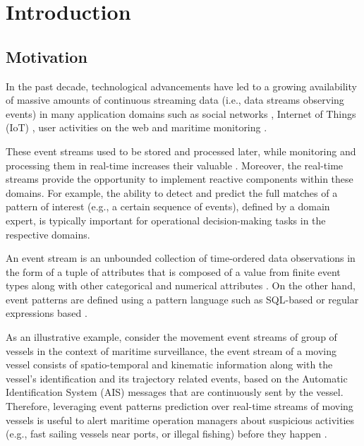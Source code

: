 \chapter{Introduction}


\section{Motivation}
\par In the past decade, technological advancements have led to a growing availability of massive amounts of continuous streaming data (i.e., data streams observing events) in many application domains such as social networks \cite{reuter2012event,mathioudakis2010twittermonitor}, Internet of Things (IoT) \cite{miorandi2012internet}, user activities on the web \cite{banerjee2001clickstream,metwally2005duplicate} and maritime monitoring \cite{patroumpas2015event,laxhammar2010conformal}.



\par These event streams used to be stored and processed later, while monitoring and processing them in real-time increases their valuable \cite{carney2002monitoring}. Moreover, the real-time streams provide the opportunity to implement reactive components within these domains.  For example, the ability to detect and predict the full matches of a pattern of interest (e.g., a certain sequence of events), defined by a domain expert, is typically important for operational decision-making tasks in the respective domains.

\par An event stream is an unbounded collection of time-ordered data observations in the form of a tuple of attributes that is composed of a value from finite event types along with other categorical and numerical attributes \cite{agrawal2008efficient,schultz2009distributed,zhou_pattern_2015,flouris2017issues}.  On the other hand, event patterns are defined using a pattern language such as SQL-based \cite{schultz2009distributed} or regular expressions based \cite{alevizos2017event}.

\par As an illustrative example, consider the movement event streams of group of vessels in the context of maritime surveillance, the event stream of a moving vessel consists of spatio-temporal and kinematic information along with the vessel's identification and its trajectory related events, based on the Automatic Identification System (AIS) \cite{ais} messages that are continuously sent by the vessel. Therefore, leveraging event patterns prediction over real-time streams of moving vessels is useful to alert maritime operation managers about suspicious activities (e.g., fast sailing vessels near ports, or illegal fishing) before they happen \cite{patroumpas2015event}. 

